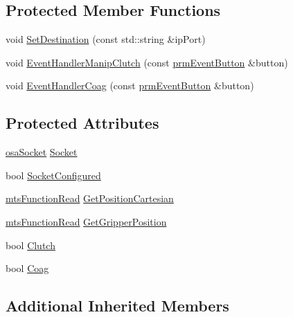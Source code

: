 \subsection*{Protected Member Functions}
\begin{DoxyCompactItemize}
\item 
void \hyperlink{classmts_intuitive_research_kit_u_d_p_streamer_ac11b0edd8b3f250ee7b358c978734507}{Set\+Destination} (const std\+::string \&ip\+Port)
\item 
void \hyperlink{classmts_intuitive_research_kit_u_d_p_streamer_ae60d9df5e7ce18b822ad984d32d93ce2}{Event\+Handler\+Manip\+Clutch} (const \hyperlink{classprm_event_button}{prm\+Event\+Button} \&button)
\item 
void \hyperlink{classmts_intuitive_research_kit_u_d_p_streamer_a03fe4535626a212fd2baf79ddd9ac01d}{Event\+Handler\+Coag} (const \hyperlink{classprm_event_button}{prm\+Event\+Button} \&button)
\end{DoxyCompactItemize}
\subsection*{Protected Attributes}
\begin{DoxyCompactItemize}
\item 
\hyperlink{classosa_socket}{osa\+Socket} \hyperlink{classmts_intuitive_research_kit_u_d_p_streamer_a0b479c1e42ce285852d0fef70f3e0597}{Socket}
\item 
bool \hyperlink{classmts_intuitive_research_kit_u_d_p_streamer_ac662f1d0ff67561e6f38d88d39f4e139}{Socket\+Configured}
\item 
\hyperlink{classmts_function_read}{mts\+Function\+Read} \hyperlink{classmts_intuitive_research_kit_u_d_p_streamer_aeb53097fbe58b91a3e2ce02356ae673f}{Get\+Position\+Cartesian}
\item 
\hyperlink{classmts_function_read}{mts\+Function\+Read} \hyperlink{classmts_intuitive_research_kit_u_d_p_streamer_abc017168d11749a876eca0ecd6c86a3e}{Get\+Gripper\+Position}
\item 
bool \hyperlink{classmts_intuitive_research_kit_u_d_p_streamer_ade3b681c621a17c3f5d3ac71bab295b1}{Clutch}
\item 
bool \hyperlink{classmts_intuitive_research_kit_u_d_p_streamer_a46783b066d84ec1969514899f3c4d8e8}{Coag}
\end{DoxyCompactItemize}
\subsection*{Additional Inherited Members}


